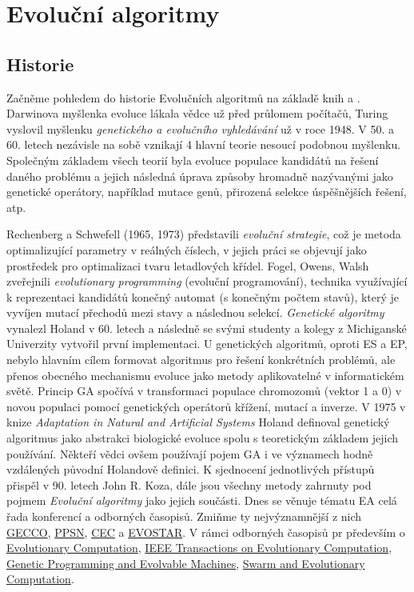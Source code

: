 \chapter{Evoluční algoritmy}
\section{Historie}
Začněme pohledem do historie Evolučních algoritmů na základě knih \cite{MitchellBook} a \cite{eibenIntro}. Darwinova myšlenka evoluce lákala vědce už před průlomem počítačů, Turing vyslovil myšlenku \textit{genetického a evolučního vyhledávání} už v roce 1948. V 50. a 60. letech nezávisle na sobě vznikají 4 hlavní teorie nesoucí podobnou myšlenku. Společným základem všech teorií byla evoluce populace kandidátů na řešení daného problému a jejich následná úprava způsoby hromadně nazývanými jako genetické operátory, například mutace genů, přirozená selekce úspěšnějších řešení, atp.
\par 
Rechenberg a Schwefell (1965, 1973) představili \textit{evoluční strategie}, což je metoda optimalizující parametry v reálných číslech, v jejich práci se objevují jako prostředek pro optimalizaci tvaru letadlových křídel. Fogel, Owens, Walsh zveřejnili \textit{evolutionary programming} (evoluční programování), technika využívající k reprezentaci kandidátů konečný automat (s konečným počtem stavů), který je vyvíjen mutací přechodů mezi stavy a následnou selekcí. \textit{Genetické algoritmy} vynalezl Holand v 60. letech a následně se svými studenty a kolegy z Michiganské Univerzity vytvořil první implementaci. U genetických algoritmů, oproti ES a EP, nebylo hlavním cílem formovat algoritmus pro řešení konkrétních problémů, ale přenos obecného mechanismu evoluce jako metody aplikovatelné v informatickém světě. Princip GA spočívá v transformaci populace chromozomů (vektor 1 a 0) v novou populaci pomocí genetických operátorů křížení, mutací a inverze. V 1975 v knize \textit{Adaptation in Natural and  Artificial Systems} \citep{HolandBook} Holand definoval genetický algoritmus jako abstrakci biologické evoluce spolu s teoretickým základem jejich používání. Někteří vědci ovšem používají pojem GA i ve významech hodně vzdálených původní Holandově definici. K sjednocení jednotlivých přístupů přispěl v 90. letech John R. Koza, dále jsou všechny metody zahrnuty pod pojmem \textit{Evoluční algoritmy} jako jejich součásti. Dnes se věnuje tématu EA celá řada konferencí a odborných časopisů. Zmiňme ty nejvýznamnější z nich  
\href{http://gecco-2017.sigevo.org/index.html/HomePage}{GECCO}, \href{http://www.ppsn2016.org/conference}{PPSN}, 
\href{http://www.cec2017.org/}{CEC} a 
\href{http://www.evostar.org/2018/}{EVOSTAR}.
V rámci odborných časopisů pr především o \href{http://www.mitpressjournals.org/loi/evco}{Evolutionary Computation}, 
\href{http://ieeexplore.ieee.org/xpl/RecentIssue.jsp?reload=true&punumber=4235}{IEEE Transactions on Evolutionary Computation}, 
\href{http://www.springer.com/computer/ai/journal/10710}{Genetic Programming and Evolvable Machines},
\href{https://www.journals.elsevier.com/swarm-and-evolutionary-computation/}{Swarm and Evolutionary Computation}.

